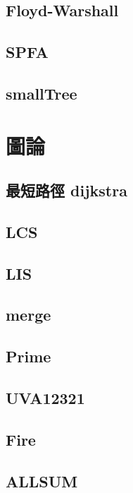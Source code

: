     \subsection{Floyd-Warshall}
        
    \subsection{SPFA}
        
    \subsection{smallTree}
        

\section{圖論}
    \subsection{最短路徑 dijkstra}
        
    \subsection{LCS}
        
    \subsection{LIS}
        
    \subsection{merge}
          
    \subsection{Prime}
        
    \subsection{UVA12321}
        
    \subsection{Fire}
        
    \subsection{ALLSUM}
        

